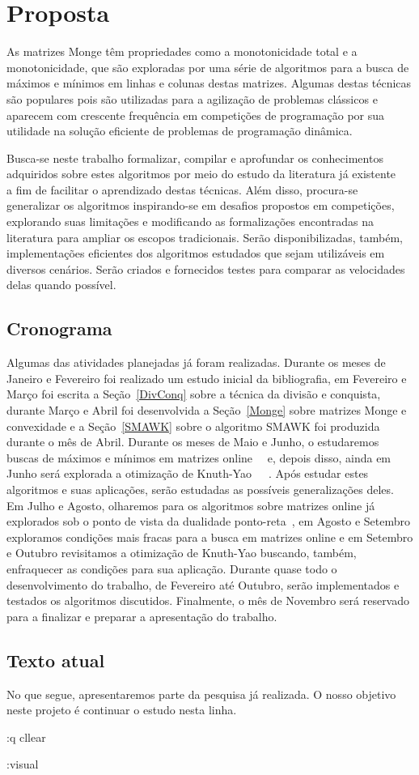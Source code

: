 \section{Proposta}

As matrizes Monge têm propriedades como a monotonicidade total e a monotonicidade, que são exploradas por uma série de algoritmos para a busca de máximos e mínimos em linhas e colunas destas matrizes. Algumas destas técnicas são populares pois são utilizadas para a agilização de problemas clássicos e aparecem com crescente frequência em competições de programação por sua utilidade na solução eficiente de problemas de programação dinâmica.

Busca-se neste trabalho formalizar, compilar e aprofundar os conhecimentos adquiridos sobre estes algoritmos por meio do estudo da literatura já existente~\cite{Galil:1992}~\cite{Bein:2009} a fim de facilitar o aprendizado destas técnicas. Além disso, procura-se generalizar os algoritmos inspirando-se em desafios propostos em competições, explorando suas limitações e modificando as formalizações encontradas na literatura para ampliar os escopos tradicionais. Serão disponibilizadas, também, implementações eficientes dos algoritmos estudados que sejam utilizáveis em diversos cenários. Serão criados e fornecidos testes para comparar as velocidades delas quando possível.

\subsection{Cronograma}
Algumas das atividades planejadas já foram realizadas. Durante os meses de Janeiro e Fevereiro foi realizado um estudo inicial da bibliografia, em Fevereiro e Março foi escrita a Seção~\ref{DivConq} sobre a técnica da divisão e conquista, durante Março e Abril foi desenvolvida a Seção~\ref{Monge} sobre matrizes Monge e convexidade e a Seção~\ref{SMAWK} sobre o algoritmo SMAWK foi produzida durante o mês de Abril.  
Durante os meses de Maio e Junho, o estudaremos buscas de máximos e mínimos em matrizes online~\cite{Galil:1992}~\cite{Brucker:1995} e, depois disso, ainda em Junho será explorada a otimização de Knuth-Yao~\cite{Bein:2009}~\cite{Knuth:1971}~\cite{Yao:1980}. Após estudar estes algoritmos e suas aplicações, serão estudadas as possíveis generalizações deles. Em Julho e Agosto, olharemos para os algoritmos sobre matrizes online já explorados sob o ponto de vista da dualidade ponto-reta~\cite{Berg:2000}, em Agosto e Setembro exploramos condições mais fracas para a busca em matrizes online e em Setembro e Outubro revisitamos a otimização de Knuth-Yao buscando, também, enfraquecer as condições para sua aplicação. Durante quase todo o desenvolvimento do trabalho, de Fevereiro até Outubro, serão implementados e testados os algoritmos discutidos. Finalmente, o mês de Novembro será reservado para a finalizar e preparar a apresentação do trabalho.

\subsection{Texto atual} \label{Intro:impl}
No que segue, apresentaremos parte da pesquisa já realizada. O nosso objetivo neste projeto é continuar o estudo nesta linha.

:q
cllear

:visual


